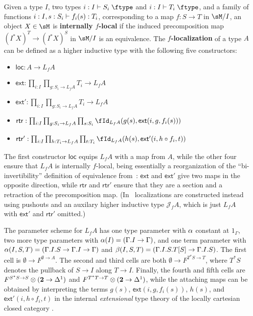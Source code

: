 \documentclass[referee]{psp}
\let\type\fibtype
\begin{document}
\begin{eg} \label{eg:localization}
  Given a type $I$, two types $i:I\types S_i\type$ and $i:I\types T_i\type$, and a family of functions $i:I,s:S_i \vdash f_i(s) : T_i$, corresponding to a map $f:S\to T$ in $\sM/I$, an object $X\in \sM$ is \textbf{internally $f$-local} if the induced precomposition map $(I^*X)^T \to (I^*X)^S$ in $\sM/I$ is an equivalence.
  The \textbf{$f$-localization} of a type $A$ can be defined as a higher inductive type with the following five constructors:
  \begin{itemize}
  \item $\mathsf{loc}:A\to L_f A$
  \item $\mathsf{ext}:\prod_{i:I} \prod_{g:S_i \to L_f A} T_i \to L_f A$
  \item $\mathsf{ext}':\prod_{i:I} \prod_{g:S_i \to L_f A} T_i \to L_f A$
  \item $\mathsf{rtr}:\prod_{i:I} \prod_{g:S_i \to L_f A} \prod_{s:S_i} \id[L_f A]{g(s)}{\mathsf{ext}(i,g,f_i(s))}$
  \item $\mathsf{rtr}':\prod_{i:I} \prod_{h:T_i \to L_f A} \prod_{t:T_i} \id[L_f A]{h(s)}{\mathsf{ext}'(i,h\circ f_i,t)}$
  \end{itemize}
  The first constructor $\mathsf{loc}$ equips $L_f A$ with a map from $A$, while the other four ensure that $L_f A$ is internally $f$-local, being essentially a reorganization of the ``bi-invertibility'' definition of equivalence from~\cite[Chapter 4]{hottbook}: $\mathsf{ext}$ and $\mathsf{ext}'$ give two maps in the opposite direction, while $\mathsf{rtr}$ and $\mathsf{rtr}'$ ensure that they are a section and a retraction of the precomposition map.
  (In~\cite{rss:modalities} localizations are constructed instead using pushouts and an auxilary higher inductive type $\mathcal{J}_f A$, which is just $L_f A$ with $\mathsf{ext}'$ and $\mathsf{rtr}'$ omitted.)

  The parameter scheme for $L_f A$ has one type parameter with $\alpha$ constant at $1_\Gamma$, two more type parameters with $\alpha(I) = (\Gamma.I\to\Gamma)$, and one term parameter with $\alpha(I,S,T) = (\Gamma.I.S\to \Gamma.I\to\Gamma)$ and $\beta(I,S,T) = (\Gamma.I.S.T[S] \to \Gamma.I.S)$.
  The first cell is $\emptyset \to F^{\emptyset\to A}$.
  The second and third cells are both $\emptyset \to F^{T^*S \to T}$, where $T^*S$ denotes the pullback of $S\to I$ along $T\to I$.
  Finally, the fourth and fifth cells are $F^{S^*S\to S} \otimes (\mathbf{2}\to {\Delta^1})$ and $F^{T^*T\to T} \otimes (\mathbf{2}\to {\Delta^1})$, while the attaching maps can be obtained by interpreting the terms $g(s)$, ${\mathsf{ext}(i,g,f_i(s))}$, $h(s)$, and ${\mathsf{ext}'(i,h\circ f_i,t)}$ in the internal \emph{extensional} type theory of the locally cartesian closed category \sM.
\end{eg}
\end{document}
